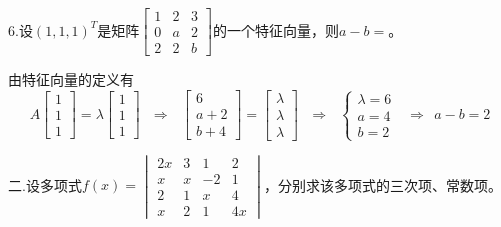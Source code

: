 \documentclass{article}
\begin{document}
6.设$(1,1,1)^{T}$是矩阵$
\begin{bmatrix}
  1 & 2 & 3 \\
  0 & a & 2\\
  2 & 2 & b
\end{bmatrix}
$的一个特征向量，则$a-b=$\underline{\hphantom{~~~~~~~~~~}}。

\begin{jie}
由特征向量的定义有
\begin{equation*}
A
\begin{bmatrix}
1\\ 1\\ 1
\end{bmatrix}=\lambda
\begin{bmatrix}
1\\ 1\\ 1
\end{bmatrix}~~~\Rightarrow~~~
\begin{bmatrix}
6\\ a+2\\ b+4
\end{bmatrix}=\begin{bmatrix}
\lambda\\ \lambda\\ \lambda
\end{bmatrix}~~~\Rightarrow~~~
\begin{cases}
\lambda=6\\
a=4\\
b=2
\end{cases}~~~\Rightarrow~~a-b=2
\end{equation*}
\end{jie}

二.设多项式$
f(x)=
\begin{vmatrix}
  2x & 3 & 1 & 2\\
  x & x & -2 & 1\\
  2 & 1 & x & 4\\
  x & 2 & 1 & 4x
\end{vmatrix}
$，分别求该多项式的三次项、常数项。
\end{document}

